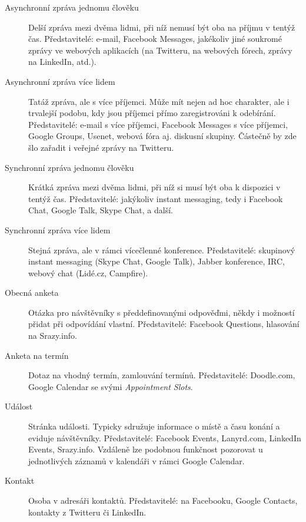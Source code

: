 \documentclass[12pt,oneside,final]{fithesis2}
\begin{document}
\begin{description}
    \item[Asynchronní zpráva jednomu člověku]
        Delší zpráva mezi dvěma lidmi, při níž nemusí být oba na příjmu v tentýž čas. Představitelé: e-mail, Facebook Messages, jakékoliv jiné soukromé zprávy ve webových aplikacích (na Twitteru, na webových fórech, zprávy na LinkedIn, atd.).

    \item[Asynchronní zpráva více lidem]
        Tatáž zpráva, ale s více příjemci. Může mít nejen ad hoc charakter, ale i trvalejší podobu, kdy jsou příjemci přímo zaregistrováni k odebírání. Představitelé: e-mail s více příjemci, Facebook Messages s více příjemci, Google Groups, Usenet, webová fóra aj. diskusní skupiny. Částečně by zde šlo zařadit i veřejné zprávy na Twitteru.

    \item[Synchronní zpráva jednomu člověku]
        Krátká zpráva mezi dvěma lidmi, při níž si musí být oba k dispozici v tentýž čas. Představitelé: jakýkoliv instant messaging, tedy i Facebook Chat, Google Talk, Skype Chat, a další.

    \item[Synchronní zpráva více lidem]
        Stejná zpráva, ale v rámci vícečlenné konference. Představitelé: skupinový instant messaging (Skype Chat, Google Talk), Jabber konference, IRC, webový chat (Lidé.cz, Campfire).

    \item[Obecná anketa]
        Otázka pro návštěvníky s předdefinovanými odpověďmi, někdy i možností přidat při odpovídání vlastní. Představitelé: Facebook Questions, hlasování na Srazy.info.

    \item[Anketa na termín]
        Dotaz na vhodný termín, zamlouvání termínů. Představitelé: Doodle.com, Google Calendar se svými \emph{Appointment Slots}.

    \item[Událost]
        Stránka události. Typicky sdružuje informace o místě a času konání a eviduje návštěvníky. Představitelé: Facebook Events, Lanyrd.com, LinkedIn Events, Srazy.info. Vzdáleně lze podobnou funkčnost pozorovat u jednotlivých záznamů v kalendáři v rámci Google Calendar.

    \item[Kontakt]
        Osoba v adresáři kontaktů. Představitelé:  na Facebooku, Google Contacts, kontakty z Twitteru či LinkedIn.
\end{description}
\end{document}
